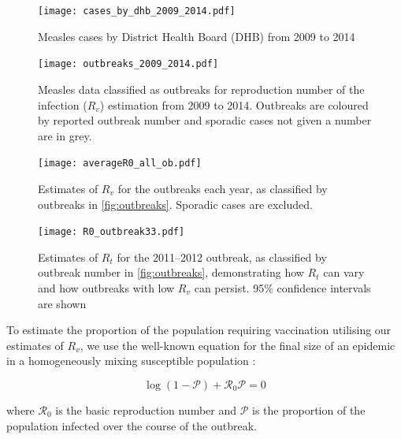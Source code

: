 \documentclass{article}
\newcommand{\Pe}{\mathcal{P}}
\newcommand{\Ro}{\mathcal{R}_0}
\begin{document}
\begin{figure}
\begin{center}
     \texttt{[image: cases\_by\_dhb\_2009\_2014.pdf]}
          \end{center}
\caption{Measles cases by District Health Board (DHB) from 2009 to 2014}
     \label{fig:dhbcases}
\end{figure}

\begin{figure}
\begin{center}
     \texttt{[image: outbreaks\_2009\_2014.pdf]}
     \end{center}
     \caption{Measles data classified as outbreaks for reproduction number of the infection ($R_v$) estimation from 2009 to 2014. Outbreaks are coloured by reported outbreak number and sporadic cases not given a number are in grey.}
     \label{fig:outbreaks}
\end{figure}

\begin{figure}
\begin{center}
     \texttt{[image: averageR0\_all\_ob.pdf]}
     \end{center}
     \caption{Estimates of $R_v$ for the outbreaks each year, as classified by outbreaks in \autoref{fig:outbreaks}. Sporadic cases are excluded.}
     \label{fig:r0}
\end{figure}


\begin{figure}
\begin{center}
     \texttt{[image: R0\_outbreak33.pdf]}
     \end{center}
     \caption{Estimates of $R_t$ for the 2011--2012 outbreak, as classified by outbreak number in \autoref{fig:outbreaks}, demonstrating how  $R_t$ can vary and how outbreaks with low  $R_v$ can persist. 95\% confidence intervals are shown}
     \label{fig:r0_2011}
\end{figure}

To estimate the proportion of the population requiring vaccination utilising our estimates of $R_v$, we use the well-known equation for the final size of an epidemic in a homogeneously mixing susceptible population \citep{diekmann13}:

\begin{equation} \label{eq:eqn1}
\log\left(1-\Pe\right)+\Ro\Pe=0
\end{equation}

where $\Ro$ is the basic reproduction number and $\Pe$ is the proportion of the population infected over the course of the outbreak.
\end{document}
